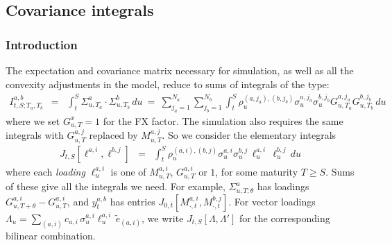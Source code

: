 \documentclass[11pt,english]{amsart}
\theoremstyle{definition}
\begin{document}
%
%
%
%
%
%
%
%


\subsection{Covariance integrals}\label{ssec:covariance_integrals}

\subsubsection{Introduction}
The expectation and covariance matrix necessary for simulation, as well as all the convexity adjustments in the model, reduce to sums of integrals of the type:
\begin{eqnarray}
  I^{a,b}_{t,S;T_a,T_b} &=& \int_t^S \Sigma^a_{u,T_a} \cdot \Sigma^b_{u,T_b} \, du
  ~=~ \sum_{j_a=1}^{N_a} \sum_{j_b=1}^{N_b} \int_t^S \rho^{(a,j_a),(b,j_b)}_u \sigma^{a,j_a}_u  \sigma^{b,j_b}_u G^{a,j_a}_{u,T_a} G^{b,j_b}_{u,T_b} \, du
\end{eqnarray}
where we set $G^{x}_{u,T} = 1$ for the FX factor. The simulation also requires the same integrals with $G^{a,j}_{u,T}$ replaced by $M^{a,j}_{u,T}$. So we consider the elementary integrals
\begin{eqnarray}
  J_{t,S}\left[\ell^{a,i},\ell^{b,j}\right] &=& \int_t^S \rho^{(a,i),(b,j)}_u \sigma^{a,i}_u  \sigma^{b,j}_u \, \ell^{a,i}_u \, \ell^{b,j}_u \, du
\end{eqnarray}
where each \emph{loading} $\ell^{a,i}_u$ is one of $M^{a,i}_{u,T}$, $G^{a,i}_{u,T}$ or $1$, for some maturity $T\ge S$. Sums of these give all the integrals we need. For example, $\Sigma^a_{u,T;\theta}$ has loadings $G^{a,i}_{u,T+\theta} - G^{a,i}_{u,T}$, and $y^{a,b}_t$ has entries $J_{0,t}[M^{a,i}_{\cdot,t},M^{b,j}_{\cdot,t}]$. For vector loadings $\Lambda_u = \sum_{(a,i)} c_{a,i}\,\sigma^{a,i}_u\ell^{a,i}_u\,\widetilde{e}_{(a,i)}$, we write $J_{t,S}[\Lambda,\Lambda']$ for the corresponding bilinear combination.
\end{document}
